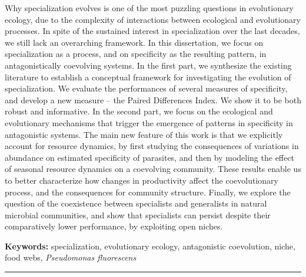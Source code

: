 {Why specialization evolves is one of the most puzzling questions in evolutionary ecology, due to the complexity of interactions between ecological and evolutionary processes. In spite of the sustained interest in specialization over the last decades, we still lack an overarching framework. In this dissertation, we focus on specialization as a process, and on specificity as the resulting pattern, in antagonistically coevolving systems. In the first part, we synthesize the existing literature to establish a conceptual framework for investigating the evolution of specialization. We evaluate the performances of several measures of specificity, and develop a new measure -- the Paired Differences Index. We show it to be both robust and informative. In the second part, we focus on the ecological and evolutionary mechanisms that trigger the emergence of patterns in specificity in antagonistic systems. The main new feature of this work is that we explicitly account for resource dynamics, by first studying the consequences of variations in abundance on estimated specificity of parasites, and then by modeling the effect of seasonal resource dynamics on a coevolving community. These results enable us to better characterize how changes in productivity affect the coevolutionary process, and the consequences for community structure. Finally, we explore the question of the coexistence between specialists and generalists in natural microbial communities, and show that specialists can persist despite their comparatively lower performance, by exploiting open niches.

\noindent\textbf{Keywords:} specialization, evolutionary ecology, antagonistic coevolution, niche, food webs, \emph{Pseudomonas fluorescens}}

\vfill
\hrule

